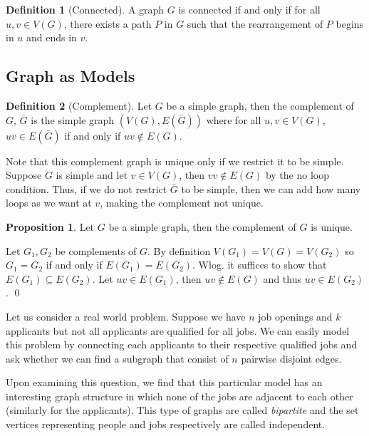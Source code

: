\documentclass[
]{article}
\theoremstyle{definition}
\newtheorem{prop}{Proposition}[theorem]
\theoremstyle{definition}
\newtheorem{definition}{Definition}[section]
\begin{document}
\begin{definition}[Connected]
  A graph \(G\) is connected if and only if for all \(u, v \in V(G)\), there 
  exists a path \(P\) in \(G\) such that the rearrangement of \(P\) begins in 
  \(u\) and ends in \(v\).
\end{definition}

\hypertarget{graph-as-models}{%
\subsection{Graph as Models}\label{graph-as-models}}

\begin{definition}[Complement]
  Let \(G\) be a simple graph, then the complement of \(G\), \(\bar{G}\) is the 
  simple graph \((V(G), E(\bar{G}))\) where for all \(u, v \in V(G)\), 
  \(uv \in E(\bar{G})\) if and only if \(uv \notin E(G)\).
\end{definition}

Note that this complement graph is unique only if we restrict it to be
simple. Suppose \(G\) is simple and let \(v \in V(G)\), then
\(vv \notin E(G)\) by the no loop condition. Thus, if we do not restrict
\(\bar{G}\) to be simple, then we can add how many loops as we want at
\(v\), making the complement not unique.

\begin{prop}
  Let \(G\) be a simple graph, then the complement of \(G\) is unique.
\end{prop}
\proof

Let \(G_1, G_2\) be complements of \(G\). By definition
\(V(G_1) = V(G) = V(G_2)\) so \(G_1 = G_2\) if and only if
\(E(G_1) = E(G_2)\). Wlog. it suffices to show that
\(E(G_1) \subseteq E(G_2)\). Let \(uv \in E(G_1)\), then
\(uv \notin E(G)\) and thus \(uv \in E(G_2)\). \qed

Let us consider a real world problem. Suppose we have \(n\) job openings
and \(k\) applicants but not all applicants are qualified for all jobs.
We can easily model this problem by connecting each applicants to their
respective qualified jobs and ask whether we can find a subgraph that
consist of \(n\) pairwise disjoint edges.

Upon examining this question, we find that this particular model has an
interesting graph structure in which none of the jobs are adjacent to
each other (similarly for the applicants). This type of graphs are
called \emph{bipartite} and the set vertices representing people and
jobs respectively are called independent.
\end{document}
